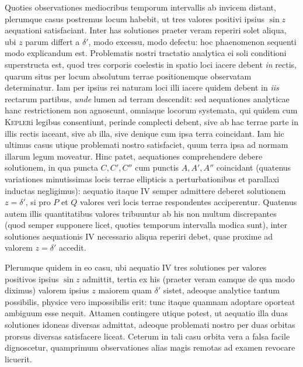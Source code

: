 Quoties observationes mediocribus temporum intervallis ab invicem distant, plerumque casus postremus locum habebit, ut tres valores positivi ipsius $\sin z$ aequationi satisfaciant. Inter has solutiones praeter veram reperiri solet aliqua, ubi $z$ parum differt a $\delta'$, modo excessu, modo defectu: hoc phaenomenon sequenti modo explicandum est. Problematis nostri tractatio analytica ei soli conditioni superstructa est, quod tres corporis coelestis in spatio loci iacere debent \textit{in} rectis, quarum situs per locum absolutum terrae positionemque observatam determinatur. Iam per ipsius rei naturam loci illi iacere quidem debent in \textit{iis} rectarum partibus, \textit{unde} lumen ad terram descendit: sed aequationes analyticae hanc restrictionem non agnoscunt, omniaque locorum systemata, qui quidem cum \textsc{Kepler}i legibus consentiunt, perinde complecti debent, sive ab hac terrae parte in illis rectis iaceant, sive ab illa, sive denique cum ipsa terra coincidant. Iam hic ultimus casus utique problemati nostro satisfaciet, quum terra ipsa ad normam illarum legum moveatur. Hinc patet, aequationes comprehendere debere solutionem, in qua puncta $C,C',C''$ cum punctis $A,A',A''$ coincidant (quatenus variationes minutissimas locis terrae ellipticis a perturbationibus et parallaxi inductas negligimus): aequatio itaque IV semper admittere deberet solutionem $z=\delta'$, si pro $P$ et $Q$ valores veri locis terrae respondentes acciperentur. Quatenus autem illis quantitatibus valores tribuuntur ab his non multum discrepantes (quod semper supponere licet, quoties temporum intervalla modica sunt), inter solutiones aequationis IV necessario aliqua reperiri debet, quae proxime ad valorem $z=\delta'$ accedit.

Plerumque quidem in eo casu, ubi aequatio IV tres solutiones per valores positivos ipsius $\sin z$ admittit, tertia ex his (praeter veram eamque de qua modo diximus) valorem ipsius $z$ maiorem quam $\delta'$ sistet, adeoque analytice tantum possibilis, physice vero impossibilis erit: tunc itaque quamnam adoptare oporteat ambiguum esse nequit. Attamen contingere utique potest, ut aequatio illa duas solutiones idoneas diversas admittat, adeoque problemati nostro per duas orbitas prorsus diversas satisfacere liceat. Ceterum in tali casu orbita vera a falsa facile dignoscetur, quamprimum observationes alias magis remotas ad examen revocare licuerit.
